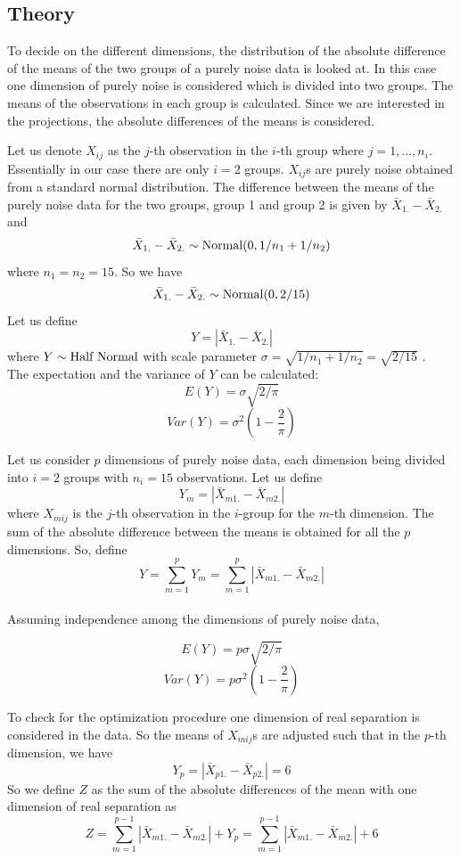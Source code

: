 \documentclass[12]{article}
\begin{document}

\subsection{Theory} \label{sec:theory}

To decide on the different dimensions, the distribution of the absolute difference of the means of the two groups of a purely noise data is looked at. In this case one dimension of purely noise is considered which is divided into two groups. The means of the observations in each group is calculated. Since we are interested in the projections, the absolute differences of the means is considered.

Let us denote $X_{ij}$ as the $j$-th observation in the $i$-th group where $j = 1, \dots, n_i$. Essentially in our case there are only $i = 2$ groups. $X_{ij}$s are purely noise obtained from a standard normal distribution. The difference between the means of the purely noise data for the two groups, group 1 and group 2 is given by $\bar{X}_{1.} - \bar{X}_{2.}$ and $$\bar{X}_{1.} - \bar{X}_{2.} \sim \hbox{Normal}(0, 1/n_1 + 1/n_2)$$ where $n_1 = n_2 = 15$. So we have $$\bar{X}_{1.} - \bar{X}_{2.} \sim \hbox{Normal}(0, 2/15)$$ Let us define $$Y  = |\bar{X}_{1.} - \bar{X}_{2.}|$$ where $Y \sim \hbox{Half Normal}$ with scale parameter $ \sigma = \sqrt{1/n_1 + 1/n_2} = \sqrt{2/15}$ . \\

The expectation and the variance of $Y$ can be calculated: 
$$E(Y) = \sigma \sqrt{2/\pi}$$
$$Var(Y) = \sigma^2 (1 - \frac{2}{\pi})$$

Let us consider $p$ dimensions of purely noise data, each dimension being divided into $i = 2$ groups with $n_i = 15$ observations. Let us define $$Y_m = |\bar{X}_{m1.} - \bar{X}_{m2.}|$$ where $X_{mij}$ is the $j$-th observation in the $i$-group for the $m$-th dimension. The sum of the absolute difference between the means is obtained for all the $p$ dimensions. So, define $$Y = \sum_{m=1}^p Y_m = \sum_{m=1}^p |\bar{X}_{m1.} - \bar{X}_{m2.}| $$ \\

Assuming independence among the dimensions of purely noise data,

$$E(Y) = p \sigma \sqrt{2/\pi}$$
$$Var(Y) = p \sigma^2 (1 - \frac{2}{\pi})$$

To check for the optimization procedure one dimension of real separation is considered in the data. So the means of $X_{mij}$s are adjusted such that in the $p$-th dimension, we have $$Y_p = |\bar{X}_{p1.} - \bar{X}_{p2.}| = 6$$ So we define $Z$ as the sum of the absolute differences of the mean with one dimension of real separation as $$Z = \sum_{m=1}^{p-1} |\bar{X}_{m1.} - \bar{X}_{m2.}| + Y_p = \sum_{m=1}^{p-1} |\bar{X}_{m1.} - \bar{X}_{m2.}| + 6$$
\end{document}
